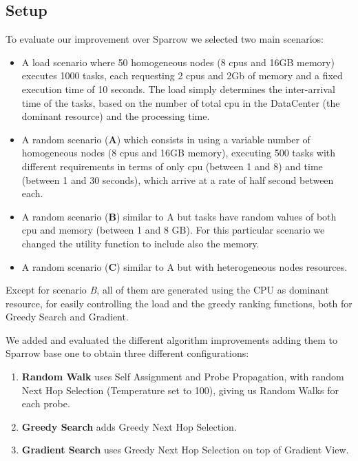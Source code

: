 \documentclass[conference]{IEEEtran}
\begin{document}
\subsection{Setup}
To evaluate our improvement over Sparrow we selected two main scenarios:
\begin{itemize}

\item A load scenario where 50 homogeneous nodes (8 cpus and 16GB memory) executes 1000 tasks, each requesting 2 cpus and 2Gb of memory and a fixed execution time of 10 seconds. The load simply determines the inter-arrival time of the tasks, based on the number of total cpu in the DataCenter (the dominant resource) and the processing time.

\item A random scenario (\textbf{A}) which consists in using  a variable number of homogeneous nodes (8 cpus and 16GB memory), executing 500 tasks with different requirements in terms of only cpu (between 1 and 8) and time (between 1 and 30 seconds), which arrive at a rate of half second between each.

\item A random scenario (\textbf{B}) similar to A but tasks have random values of both cpu and memory (between 1 and 8 GB). For this particular scenario we changed the utility function to include also the memory.

\item A random scenario (\textbf{C}) similar to A but with heterogeneous nodes resources.

\end{itemize}

Except for scenario \textit{B}, all of them are generated using the CPU as dominant resource, for easily controlling the load and the greedy ranking functions, both for Greedy Search and Gradient.

We added and evaluated the different algorithm improvements adding them to Sparrow base one to obtain three different configurations: 
\begin{enumerate}
\item \textbf{Random Walk} uses Self Assignment and Probe Propagation, with random Next Hop Selection (Temperature set to 100), giving us Random Walks for each probe. 
\item \textbf{Greedy Search} adds Greedy Next Hop Selection.
\item \textbf{Gradient Search} uses Greedy Next Hop Selection on top of Gradient View.
\end{enumerate}
\end{document}
